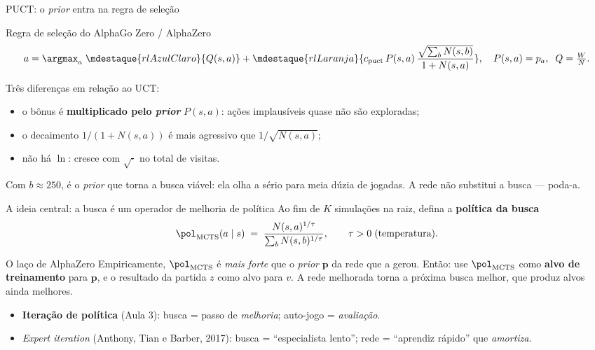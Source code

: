 \documentclass[aspectratio=169, 11pt]{beamer}
\newcommand{\Nv}[1]{N(#1)}                      %
\begin{document}
\begin{frame}{PUCT: o \emph{prior} entra na regra de seleção}
  \vspace{-7pt}
  \begin{teobox}{Regra de seleção do AlphaGo Zero / AlphaZero}
    \[
      a = \argmax_{a}\;
      \mdestaque{rlAzulClaro}{Q(s,a)}
      +
      \mdestaque{rlLaranja}{c_{\text{puct}}\, P(s,a)\,
      \frac{\sqrt{\sum_b \Nv{s,b}}}{1+\Nv{s,a}}},
      \quad P(s,a)=p_a,\;\; Q=\tfrac{W}{N} .
    \]
  \end{teobox}

  \pause
  Três diferenças em relação ao UCT:
  \begin{itemize}
    \item o bônus é \textbf{multiplicado pelo \emph{prior}} $P(s,a)$: ações implausíveis quase não são exploradas;
    \item o decaimento $1/(1+\Nv{s,a})$ é mais agressivo que $1/\sqrt{\Nv{s,a}}$;
    \item não há $\ln$: cresce com $\sqrt{\cdot}$ no total de visitas.
  \end{itemize}

  \pause
  \begin{ideiabox}
    Com $b\approx 250$, é o \emph{prior} que torna a busca viável: ela olha a sério para meia dúzia de jogadas. A rede não substitui a busca --- poda-a.
  \end{ideiabox}
\end{frame}

\begin{frame}{A ideia central: a busca é um operador de melhoria de política}
  Ao fim de $K$ simulações na raiz, defina a \textbf{política da busca}
  \[
    \pol_{\text{MCTS}}(a \mid s) \;=\;
    \frac{\Nv{s,a}^{1/\tau}}{\sum_b \Nv{s,b}^{1/\tau}},
    \qquad \tau > 0 \;\text{(temperatura)}.
  \]

  \pause
  \begin{teobox}{O laço de AlphaZero}
    Empiricamente, $\pol_{\text{MCTS}}$ é \emph{mais forte} que o \emph{prior}
    $\bm{p}$ da rede que a gerou. Então: use $\pol_{\text{MCTS}}$ como
    \textbf{alvo de treinamento} para $\bm{p}$, e o resultado da partida $z$
    como alvo para $v$. A rede melhorada torna a próxima busca melhor, que
    produz alvos ainda melhores.
  \end{teobox}

  \pause
  \begin{itemize}
    \item \textbf{Iteração de política} (Aula 3): busca = passo de \emph{melhoria}; auto-jogo = \emph{avaliação}.
    \item \emph{Expert iteration} (Anthony, Tian e Barber, 2017): busca = ``especialista lento''; rede = ``aprendiz rápido'' que \emph{amortiza}.
  \end{itemize}
\end{frame}
\end{document}
